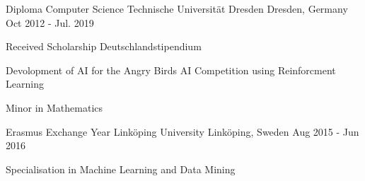 \begin{cventries}
	\cventry
	{Diploma Computer Science} %
	{Technische Universität Dresden} %
	{Dresden, Germany} %
	{Oct 2012 - Jul. 2019} %
	{
		\begin{cvitems} %
			\item {Received Scholarship Deutschlandstipendium}
			\item{Devolopment of AI for the Angry Birds AI Competition using Reinforcment Learning}
			\item{Minor in Mathematics}
		\end{cvitems}
	}

	\cventry
	{Erasmus Exchange Year} %
	{Linköping University} %
	{Linköping, Sweden} %
	{Aug 2015 - Jun 2016} %
	{
		\begin{cvitems} %
			\item{Specialisation in Machine Learning and Data Mining}
		\end{cvitems}
	}
\end{cventries}